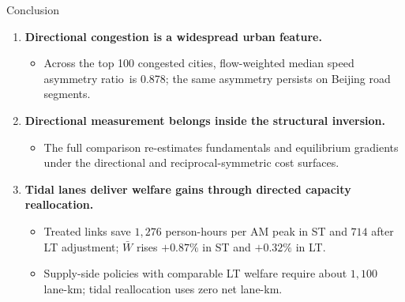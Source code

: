 \documentclass[11pt,aspectratio=169]{beamer}
\newcommand{\good}[1]{\textcolor{blue!70!black}{#1}}
\newcommand{\bad}[1]{\textcolor{red!70!black}{#1}}
\newcommand{\SAR}{speed asymmetry ratio}
\begin{document}
\begin{frame}{Conclusion}
\begin{enumerate}
  \item \textbf{Directional congestion is a widespread urban feature.}
  \begin{itemize}\footnotesize
    \item Across the top 100 congested cities, flow-weighted median \SAR\ is \good{0.878}; the same asymmetry persists on Beijing road segments.
  \end{itemize}
  \item \textbf{Directional measurement belongs inside the structural inversion.}
  \begin{itemize}\footnotesize
    \item The full comparison re-estimates fundamentals and equilibrium gradients under the directional and reciprocal-symmetric cost surfaces.
  \end{itemize}
  \item \textbf{Tidal lanes deliver welfare gains through directed capacity reallocation.}
  \begin{itemize}\footnotesize
    \item Treated links save \good{$1{,}276$ person-hours per AM peak} in ST and \good{$714$} after LT adjustment; $\bar W$ rises \good{$+0.87\%$} in ST and \good{$+0.32\%$} in LT.
    \item Supply-side policies with comparable LT welfare require about \bad{$1{,}100$ lane-km}; tidal reallocation uses \good{zero net lane-km}.
  \end{itemize}
\end{enumerate}
\end{frame}

\appendix
\end{document}
